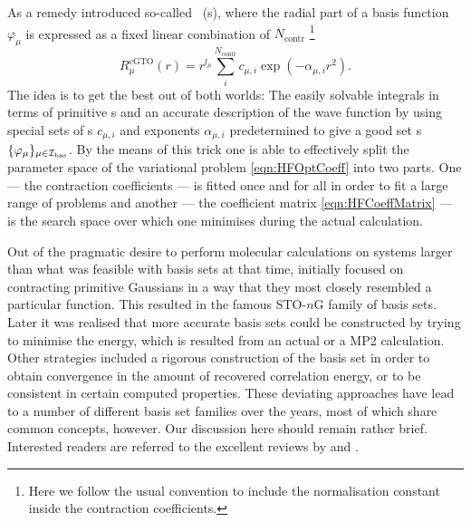 As a remedy \citet{Hehre1969} introduced so-called
~({\cGTO}s),
where the radial part of a basis function $\varphi_\mu$
is expressed as a fixed linear combination of $N_\text{contr}$
%
\footnote{Here we follow the usual convention to include the normalisation constant
	inside the contraction coefficients.}
\[ R^\text{cGTO}_\mu(r) = r^{l_\mu} \sum_i^{N_\text{contr}} c_{\mu,i} \exp(-\alpha_{\mu,i} r^2). \]
The idea is to get the best out of both worlds:
The easily solvable integrals in terms of primitive {\GTO}s
and an accurate description of the wave function by using
special sets of s
$c_{\mu,i}$ and exponents $\alpha_{\mu,i}$
predetermined to give a good set {\cGTO}s $\{\varphi_\mu\}_{\mu\in\mathcal{I}_\text{bas}}$.
By the means of this trick
one is able to effectively split the parameter space of the variational problem
\eqref{eqn:HFOptCoeff} into two parts.
One --- the contraction coefficients ---
is fitted once and for all in order to fit a large range of problems
and another --- the coefficient matrix \eqref{eqn:HFCoeffMatrix} ---
is the search space over which one minimises during the actual calculation.

Out of the pragmatic desire to perform molecular calculations
on systems larger than what was feasible with \STO basis sets at that time,
\citet{Hehre1969} initially focused on contracting primitive Gaussians
in a way that they most closely resembled a particular \STO function.
This resulted in the famous STO-$n$G family of basis sets.
Later it was realised that more accurate basis sets could be constructed
by trying to minimise the energy,
which is resulted from an actual \HF or a MP2 calculation.
Other strategies included a rigorous construction of the basis set
in order to obtain convergence in the amount of recovered correlation energy,
or to be consistent in certain computed properties.
These deviating approaches have lead to a number of
different basis set families over the years,
most of which share common concepts, however.
Our discussion here should remain rather brief.
Interested readers are referred to the excellent reviews by \citet{Hill2013}
and \citet{Jensen2013}.

